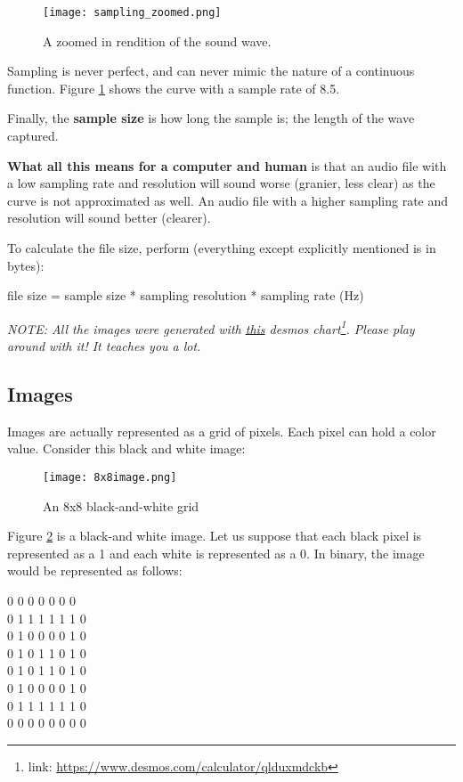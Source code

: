 \documentclass[../main.tex]{subfiles}
\begin{document}
\begin{figure}[H]
    \centering
    \texttt{[image: sampling\_zoomed.png]}
    \caption{A zoomed in rendition of the sound wave.}
    \label{fig:sampling_zoomed}
\end{figure}

Sampling is never perfect, and can never mimic the nature of a continuous function. Figure \ref{fig:sampling_zoomed} shows the curve with a sample rate of 8.5.

Finally, the \textbf{sample size} is how long the sample is; the length of the wave captured.

\textbf{What all this means for a computer and human} is that an audio file with a low sampling rate and resolution will sound worse (granier, less clear) as the curve is not approximated as well. An audio file with a higher sampling rate and resolution will sound better (clearer).

To calculate the file size, perform (everything except explicitly mentioned is in bytes):

{\centering\mono
file size = sample size * sampling resolution * sampling rate (Hz)
}

\textit{NOTE: All the images were generated with \href{https://www.desmos.com/calculator/qlduxmdckb}{this} desmos chart\footnote{link: \url{https://www.desmos.com/calculator/qlduxmdckb}}. Please play around with it! It teaches you a lot.}

\newpage
\subsection{Images}

Images are actually represented as a grid of pixels. Each pixel can hold a color value. Consider this black and white image:

\begin{figure}[H]
    \centering
    \texttt{[image: 8x8image.png]}
    \caption{An 8x8 black-and-white grid}
    \label{fig:8x8image}
\end{figure}

Figure \ref{fig:8x8image} is a black-and white image. Let us suppose that each black pixel is represented as a 1 and each white is represented as a 0. In binary, the image would be represented as follows:

\medskip

{\mono{} 0 0 0 0 0 0 0\\
    0 1 1 1 1 1 1 0\\
    0 1 0 0 0 0 1 0\\
    0 1 0 1 1 0 1 0\\
    0 1 0 1 1 0 1 0\\
    0 1 0 0 0 0 1 0\\
    0 1 1 1 1 1 1 0\\
    0 0 0 0 0 0 0 0\\
}
\end{document}
